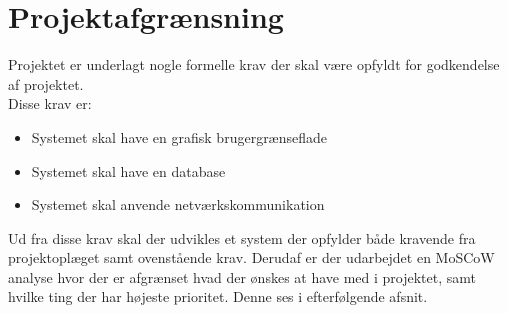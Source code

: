 \chapter{Projektafgrænsning}
Projektet er underlagt nogle formelle krav der skal være opfyldt for godkendelse af projektet. \\
Disse krav er:
\begin{itemize}[noitemsep]
	\item Systemet skal have en grafisk brugergrænseflade
	\item Systemet skal have en database
	\item Systemet skal anvende netværkskommunikation
\end{itemize}

Ud fra disse krav skal der udvikles et system der opfylder både kravende fra projektoplæget samt ovenstående krav. Derudaf er der udarbejdet en MoSCoW analyse hvor der er afgrænset hvad der ønskes at have med i projektet, samt hvilke ting der har højeste prioritet. Denne ses i efterfølgende afsnit.
